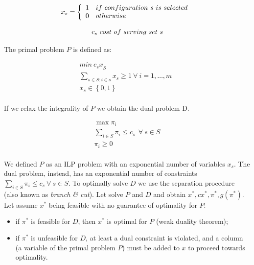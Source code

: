 \begin{equation}
	x_s=\left\{
                \begin{array}{ll}
                  1  & if\ configuration\ s\ is\ selected\\
                  0 & otherwise\\
                \end{array}
              \right.\\
\label{eq_dualProblemProblemVariables1}
\end{equation}

\begin{equation}
	c_s\ cost\ of\ serving\ set\ s \\
\label{eq_dualProblemProblemVariables2}
\end{equation}

The primal problem $P$ is defined as:

\begin{equation}
\begin{split}
    min\ {c_sx}_S\\
    \sum_{s\in S:i\in s}{x_s\geq1}\ \forall\ i=1,\ldots,m\ \ \\
    x_s\in\left\{0,1\right\}\\
\end{split}
\label{eq_dualProblemPrimal}
\end{equation}

If we relax the integrality of $P$  we obtain the dual problem D.

\begin{equation}
\begin{split}
    \max{\pi_i}\\
    \sum_{i\in S}{\pi_i\le c_s\ \ \forall\ s\in S}\\
    \pi_i\geq0\\
\end{split}
\label{eq_dualProblemDual}
\end{equation}

We defined $P$ as an ILP problem with an exponential number of variables $x_s$. The dual problem, instead, has an exponential number of constraints $\sum_{i\in S}{\pi_i\le c_s\ \forall\ s\in S}$. To optimally solve $D$ we use the separation procedure (also known as \textit{branch \& cut}). Let solve $P$ and $D$ and obtain $x^\ast,cx^\ast,\pi^\ast,g\left(\pi^\ast\right)$. Let assume $x^\ast$ being feasible with no guarantee of optimality for $P$:
\begin{itemize}
    \item if $\pi^\ast$ is feasible for $D$, then $x^\ast$ is optimal for $P$ (weak duality theorem);
    \item if $\pi^\ast$ is unfeasible for $D$, at least a dual constraint is violated, and a column (a variable of the primal problem $P$) must be added to $x$ to proceed towards optimality.
\end{itemize}

